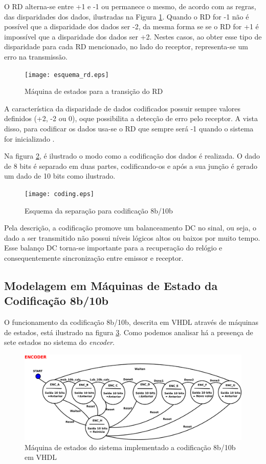 \documentclass[11pt,twocolumn]{article}
\begin{document}
O RD alterna-se entre +1 e -1 ou permanece o mesmo, de acordo com as regras, das disparidades dos dados, ilustradas na Figura \ref{rd}. Quando o RD for -1 não é possível que a disparidade dos dados ser -2, da mesma forma se se o RD for +1 é impossível que a disparidade dos dados ser +2. Nestes casos, ao obter esse tipo de disparidade para cada RD mencionado, no lado do receptor, representa-se um erro na transmissão.

\begin{figure}[htb]
	\centering
	\texttt{[image: esquema\_rd.eps]}
	\caption{Máquina de estados para a transição do RD}
	\label{rd}
\end{figure}

A característica da disparidade de dados codificados possuir sempre valores definidos (+2, -2 ou 0), oque possibilita a detecção de erro pelo receptor. A vista disso, para codificar os dados usa-se o RD que sempre será -1 quando o sistema for inicializado \cite{Franaszek}.

Na figura \ref{coding}, é ilustrado o modo como a codificação dos dados é realizada. O dado de 8 bits é separado em duas partes, codificando-os e após a sua junção é gerado um dado de 10 bits como ilustrado.  

\begin{figure}[htb]
	\centering
	\texttt{[image: coding.eps]}
	\caption{Esquema da separação para codificação 8b/10b}
	\label{coding}
\end{figure}

Pela descrição, a codificação promove um balanceamento DC no sinal, ou seja, o dado a ser transmitido não possui níveis lógicos altos ou baixos por muito tempo. Esse balanço DC torna-se importante para a recuperação do relógio e consequentemente sincronização entre emissor e receptor.

\subsection{Modelagem em Máquinas de Estado da Codificação 8b/10b}

O funcionamento da codificação 8b/10b, descrita em VHDL através de máquinas de estados, está ilustrado na figura \ref{machine_system}. Como podemos analisar há a presença de sete estados no sistema do \textit{encoder}. 

\begin{figure}[htb]
	\centering
	\includegraphics[scale=0.075]{FSM8b10b_v3.png}
	\caption{Máquina de estados do sistema implementado a codificação 8b/10b em VHDL}
	\label{machine_system}
\end{figure}
\end{document}
